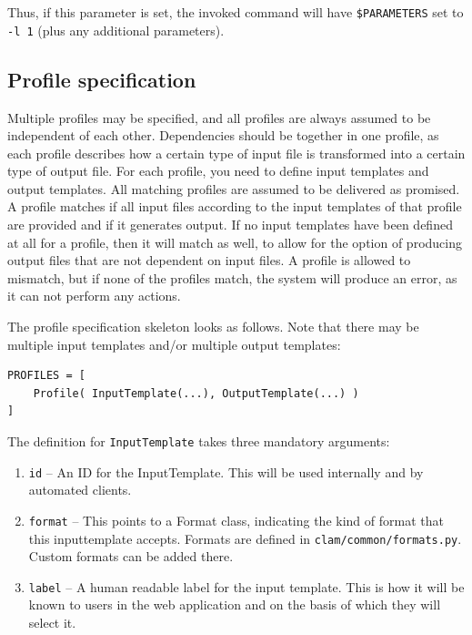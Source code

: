 \documentclass[a4paper,12pt]{report}
\begin{document}
Thus, if this parameter is set, the invoked command will have \texttt{\$PARAMETERS} set to \texttt{-l 1} (plus any additional parameters).

\subsection{Profile specification}

Multiple profiles may be specified, and all profiles are always assumed to be
independent of each other. Dependencies should be together in one profile, as
each profile describes how a certain type of input file is transformed into a
certain type of output file. For each profile, you need to define input
templates and output templates. All matching profiles are assumed to be
delivered as promised. A profile matches if all input files according to the
input templates of that profile are provided and if it generates output. If no
input templates have been defined at all for a profile, then it will match as
well, to allow for the option of producing output files that are not dependent
on input files. A profile is allowed to mismatch, but if none of the profiles
match, the system will produce an error, as it can not perform any actions. 

The profile specification skeleton looks as follows. Note that there may be
multiple input templates and/or multiple output templates:

{\footnotesize{
\begin{verbatim}
PROFILES = [ 
    Profile( InputTemplate(...), OutputTemplate(...) ) 
]
\end{verbatim}
}}


The definition for \texttt{InputTemplate} takes three mandatory arguments:

\begin{enumerate}
\item \texttt{id} -- An ID for the InputTemplate. This will be used internally and by automated clients.
\item \texttt{format} -- This points to a Format class, indicating the kind of format that this inputtemplate accepts. Formats are defined in \texttt{clam/common/formats.py}. Custom formats can be added there.
\item \texttt{label} -- A human readable label for the input template. This is how it will be known to users in the web application and on the basis of which they will select it.
\end{enumerate}
\end{document}
